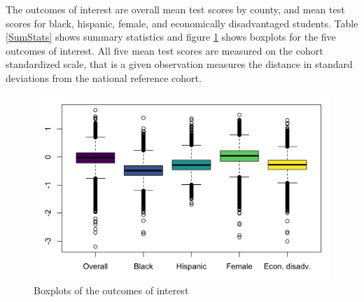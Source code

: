 The outcomes of interest are overall mean test scores by county, and mean test scores for black, hispanic, female, and economically disadvantaged students. Table \ref{SumStats} shows summary statistics and figure \ref{DepVarsBoxplot} shows boxplots for the five outcomes of interest. All five mean test scores are measured on the cohort standardized scale, that is a given observation measures the distance in standard deviations from the national reference cohort.




\begin{figure}[!h]
	\centering
	\includegraphics[scale=1]{"../Code & Data/DepVarsBoxplot.png"}
	\caption{Boxplots of the outcomes of interest}
	\label{DepVarsBoxplot}
\end{figure}








